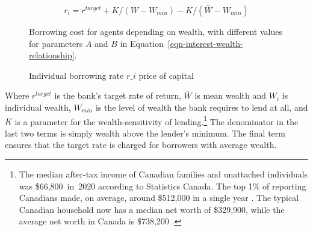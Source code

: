 \begin{equation}
r_i = r^{target}+ K/(W-W_{min}) -K/(\bar W - W_{min})\label{eqn-interest-wealth-relationship}
\end{equation}

 

\begin{figure}[!hb]
\begin{center}
\caption[Borrowing cost for agents depending on wealth.]{Borrowing cost for agents depending on wealth, with different values for parameters $A$ and $B$ in Equation~\ref{eqn-interest-wealth-relationship}.} %
\label{fig-capital-cost}
\end{center}
\end{figure}

\begin{figure}
\centering
\label{fig-capital-cost}
\caption{Individual borrowing rate $r\_i$ price of capital}
\label{fig:Wealth-based}
\end{figure}

Where  $r^{target}$ is the bank's target rate of return,  $\bar{W}$ is mean wealth and $W_i$ is individual wealth, $W_{min}$ is the level of wealth the bank requires to lend at all, and $K$ is a parameter for the wealth-sensitivity of lending.\footnote{The median after-tax income of Canadian families and unattached individuals was \$66,800 in 2020 according to Statistics Canada.%
 The top 1\% of reporting Canadians made, on average, around \$512,000 in a single year \cite{WEB_model-stats-can-canadian-incomes}. %
 The typical Canadian household now has a median net worth of \$329,900, while the average net worth in Canada is \$738,200 \cite{WEB-model-stats-can-median-net-worth}.  %
} The denominator in the last two terms is simply wealth above the lender's minimum. The final term ensures that the target rate is charged for borrowers with average wealth.


